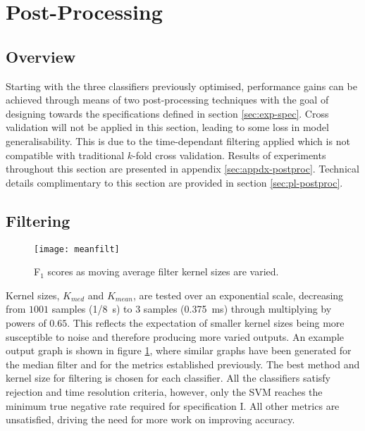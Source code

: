 \section{Post-Processing}
\label{sec:exp-postproc}
    \subsection{Overview}
    \label{subsec:exp-postproc-overview}
        Starting with the three classifiers previously optimised, performance gains can be achieved through means of two post-processing techniques with the goal of designing towards the specifications defined in section \ref{sec:exp-spec}. Cross validation will not be applied in this section, leading to some loss in model generalisability. This is due to the time-dependant filtering applied which is not compatible with traditional $k$-fold cross validation. Results of experiments throughout this section are presented in appendix \ref{sec:appdx-postproc}. Technical details complimentary to this section are provided in section \ref{sec:pl-postproc}.
    \subsection{Filtering}
    \label{subsec:exp-postproc-filt}
        \begin{figure}[ht]
            \centering
            \texttt{[image: meanfilt]}
            \caption{F$_{1}$ scores as moving average filter kernel sizes are varied.}
            \label{fig:exp-postproc-filt}
        \end{figure}
        Kernel sizes, $K_{med}$ and $K_{mean}$, are tested over an exponential scale, decreasing from $1001$ samples (\SI{1/8}{\second}) to $3$ samples (\SI{0.375}{\milli\second}) through multiplying by powers of $0.65$. This reflects the expectation of smaller kernel sizes being more susceptible to noise and therefore producing more varied outputs. An example output graph is shown in figure \ref{fig:exp-postproc-filt}, where similar graphs have been generated for the median filter and for the metrics established previously. The best method and kernel size for filtering is chosen for each classifier. All the classifiers satisfy rejection and time resolution criteria, however, only the SVM reaches the minimum true negative rate required for specification I. All other metrics are unsatisfied, driving the need for more work on improving accuracy.

